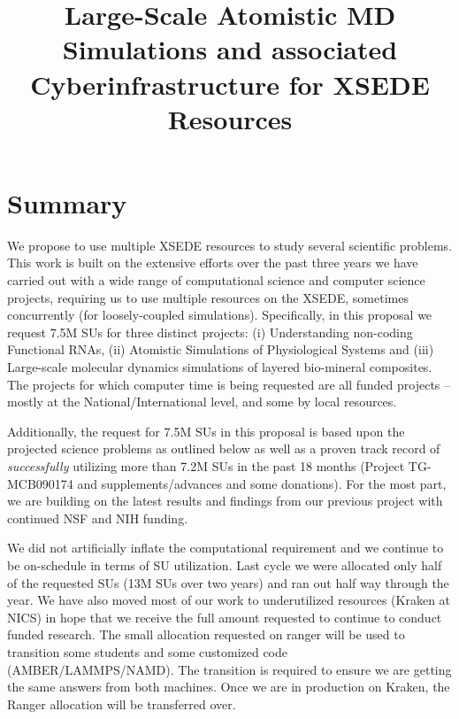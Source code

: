 \documentclass[a4paper,11pt]{article}
\begin{document}
\title{\Large Large-Scale Atomistic MD Simulations and associated
  Cyberinfrastructure for XSEDE Resources}

\date{}

\maketitle
 
\section{Summary}
We propose to use multiple XSEDE resources to study several scientific problems. This work is built on the extensive efforts over the past three years we have carried out with a wide range of computational science and computer science projects, requiring us to use multiple resources on the XSEDE, sometimes concurrently (for loosely-coupled simulations).  Specifically, in this proposal we request 7.5M SUs for three distinct projects: (i) Understanding non-coding Functional RNAs, (ii) Atomistic Simulations of Physiological Systems and (iii) Large-scale molecular dynamics simulations of layered bio-mineral composites. The projects for which computer time is being requested are all funded projects -- mostly at the National/International level, and some by local resources.

Additionally, the request for 7.5M SUs in this proposal is based upon the projected science problems as outlined below as well as a proven track record of {\it successfully} utilizing more than 7.2M SUs in the past 18 months (Project TG-MCB090174 and supplements/advances and some donations). For the most part, we are building on the latest results and findings from our previous project with continued NSF and NIH funding.

We did not artificially inflate the computational requirement and we continue to be on-schedule in terms of SU utilization. Last cycle we were allocated only half of the requested SUs (13M SUs over two years) and ran out half way through the year. We have also moved most of our work to underutilized resources (Kraken at NICS) in hope that we receive the full amount requested to continue to conduct funded research. The small allocation requested on ranger will be used to transition some students and some customized code (AMBER/LAMMPS/NAMD). The transition is required to ensure we are getting the same answers from both machines. Once we are in production on Kraken, the Ranger allocation will be transferred over.
\end{document}
